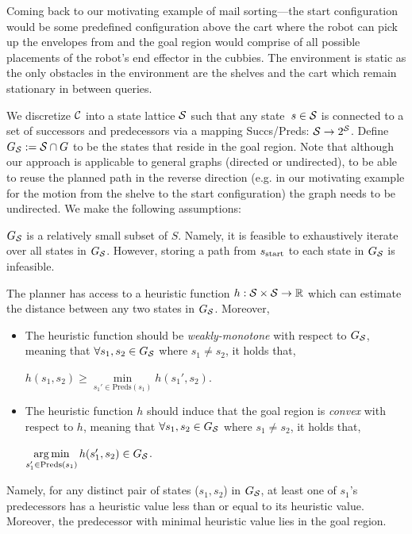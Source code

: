 \documentclass[a4paper]{report}
\begin{document}
Coming back to our motivating example of mail sorting---the start configuration would be some predefined configuration above the cart where the robot can pick up the envelopes from and the goal region would comprise of all possible placements of the robot's end effector in the cubbies. The environment is static as the only obstacles in the environment are the shelves and the cart which remain stationary in between queries.

We discretize $\mathcal{C}$ into a state lattice $\mathcal{S}$ such that any state~$s \in \mathcal{S}$ is connected to a set of successors and predecessors via a mapping Succs/Preds: $\mathcal{S} \rightarrow 2^\mathcal{S}$.
Define $G_\mathcal{S} := \mathcal{S} \cap G$ to be the states that reside in the goal region. Note that although our approach is applicable to general graphs (directed or undirected), to be able to reuse the planned path in the reverse direction (e.g. in our motivating example for the motion from the shelve to the start configuration) the graph needs to be undirected.
We make the following assumptions:

\vspace{2mm}\begin{assumption} \label{asm:1:1} $G_\mathcal{S}$ is a relatively small subset of $S$. Namely, it is feasible to exhaustively iterate over all states in $G_\mathcal{S}$.
However, storing a path from $s_{\textrm{start}}$ to each state in $G_\mathcal{S}$ is infeasible.
\end{assumption}
  
\vspace{2mm}\begin{assumption} \label{asm:1:2} The planner has access to a heuristic function $h: \mathcal{S} \times \mathcal{S} \rightarrow \mathbb{R}$ which can estimate the distance between any two states in $G_\mathcal{S}$. Moreover, 
 \begin{itemize}
  \item The heuristic function should be \textit{weakly-monotone} with respect to $G_\mathcal{S}$, meaning that $\forall s_1, s_2  \in G_\mathcal{S}$ where $s_1 \neq s_2 $, it holds that,
  \begin{center}
    $h(s_1, s_2) \geq \min\limits_{s_1' \in \text{Preds}(s_1)} h(s_1', s_2)$.
  \end{center}

  \item The heuristic function $h$ should induce that the goal region is \emph{convex} with respect to $h$, meaning that $\forall s_1, s_2  \in G_\mathcal{S}$ where $s_1 \neq s_2 $, it holds that,
  \begin{center}
     $\operatorname*{arg\,min}\limits_{s_1' \in \text{Preds}(s_1)} h(s_1', s_2) \in G_\mathcal{S}$.
  \end{center}

 \end{itemize}
 Namely, for any distinct pair of states ($s_1, s_2$) in $G_\mathcal{S}$, at least one of $s_1$'s predecessors has a heuristic value less than or equal to its heuristic value.
 Moreover, the predecessor with minimal heuristic value lies in the goal region.
\end{assumption}
\end{document}
